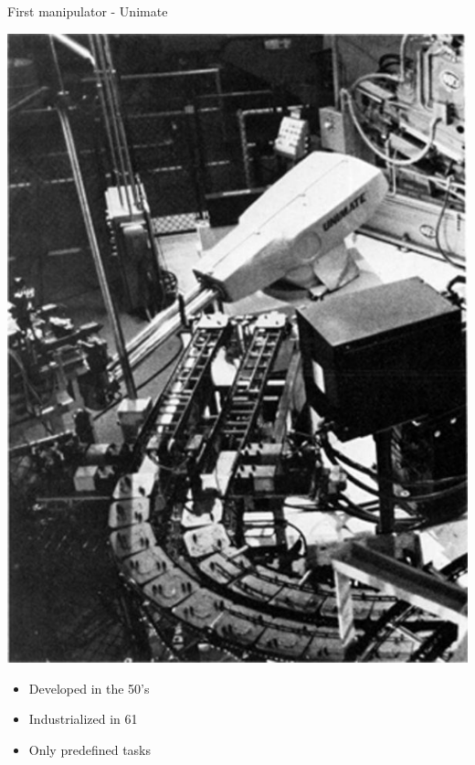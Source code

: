 \documentclass[usenames,dvipsnames,xcolor=table]{beamer}
\begin{document}
\begin{frame}{First manipulator - Unimate}
\begin{center}
\begin{minipage}{0.49\linewidth}
\begin{center}
\includegraphics[width=0.8\linewidth]{unimate.png}
\end{center}
\end{minipage}
\hfill
\begin{minipage}{0.49\linewidth}
\begin{itemize}
\item Developed in the 50's
\item Industrialized in 61
\item Only predefined tasks
\end{itemize}
\end{minipage}

\end{center}
\end{frame}

\end{document}

